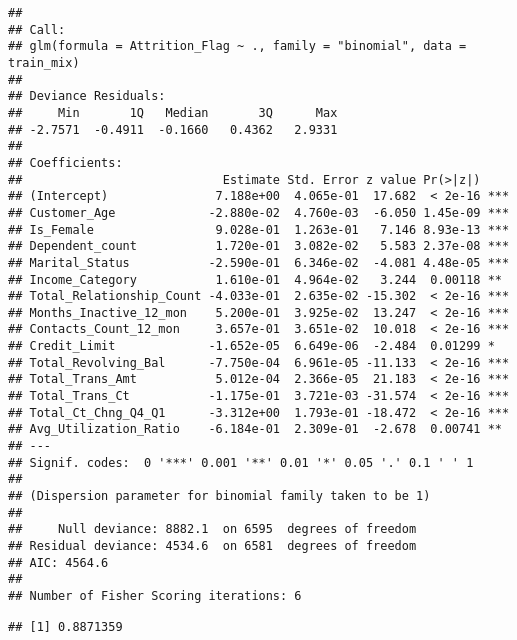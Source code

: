 \documentclass[
]{article}
\newenvironment{Shaded}{\begin{snugshade}}{\end{snugshade}}
\newcommand{\DecValTok}[1]{\textcolor[rgb]{0.00,0.00,0.81}{#1}}
\newcommand{\FloatTok}[1]{\textcolor[rgb]{0.00,0.00,0.81}{#1}}
\newcommand{\FunctionTok}[1]{\textcolor[rgb]{0.00,0.00,0.00}{#1}}
\newcommand{\NormalTok}[1]{#1}
\newcommand{\OtherTok}[1]{\textcolor[rgb]{0.56,0.35,0.01}{#1}}
\newcommand{\SpecialCharTok}[1]{\textcolor[rgb]{0.00,0.00,0.00}{#1}}
\begin{document}
\begin{verbatim}
## 
## Call:
## glm(formula = Attrition_Flag ~ ., family = "binomial", data = train_mix)
## 
## Deviance Residuals: 
##     Min       1Q   Median       3Q      Max  
## -2.7571  -0.4911  -0.1660   0.4362   2.9331  
## 
## Coefficients:
##                            Estimate Std. Error z value Pr(>|z|)    
## (Intercept)               7.188e+00  4.065e-01  17.682  < 2e-16 ***
## Customer_Age             -2.880e-02  4.760e-03  -6.050 1.45e-09 ***
## Is_Female                 9.028e-01  1.263e-01   7.146 8.93e-13 ***
## Dependent_count           1.720e-01  3.082e-02   5.583 2.37e-08 ***
## Marital_Status           -2.590e-01  6.346e-02  -4.081 4.48e-05 ***
## Income_Category           1.610e-01  4.964e-02   3.244  0.00118 ** 
## Total_Relationship_Count -4.033e-01  2.635e-02 -15.302  < 2e-16 ***
## Months_Inactive_12_mon    5.200e-01  3.925e-02  13.247  < 2e-16 ***
## Contacts_Count_12_mon     3.657e-01  3.651e-02  10.018  < 2e-16 ***
## Credit_Limit             -1.652e-05  6.649e-06  -2.484  0.01299 *  
## Total_Revolving_Bal      -7.750e-04  6.961e-05 -11.133  < 2e-16 ***
## Total_Trans_Amt           5.012e-04  2.366e-05  21.183  < 2e-16 ***
## Total_Trans_Ct           -1.175e-01  3.721e-03 -31.574  < 2e-16 ***
## Total_Ct_Chng_Q4_Q1      -3.312e+00  1.793e-01 -18.472  < 2e-16 ***
## Avg_Utilization_Ratio    -6.184e-01  2.309e-01  -2.678  0.00741 ** 
## ---
## Signif. codes:  0 '***' 0.001 '**' 0.01 '*' 0.05 '.' 0.1 ' ' 1
## 
## (Dispersion parameter for binomial family taken to be 1)
## 
##     Null deviance: 8882.1  on 6595  degrees of freedom
## Residual deviance: 4534.6  on 6581  degrees of freedom
## AIC: 4564.6
## 
## Number of Fisher Scoring iterations: 6
\end{verbatim}

\begin{Shaded}
\end{Shaded}

\begin{verbatim}
## [1] 0.8871359
\end{verbatim}
\end{document}

